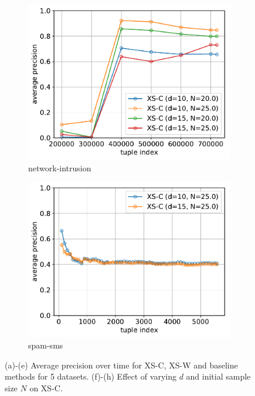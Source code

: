 \documentclass[11pt,onecolumn]{article}
\begin{document}
\begin{figure}[ht!]
\begin{subfigure}[t]{0.24\textwidth}
				\includegraphics[width=\linewidth]{fig/xs_c_depths_init_samples_http.pdf}
				\caption{network-intrusion}
		\end{subfigure}
		\begin{subfigure}[t]{0.24\textwidth}
				\centering
				\includegraphics[width=\linewidth]{fig/xs_c_depths_init_samples_sms.pdf}
				\caption{spam-sms}
		\end{subfigure}
		\caption{(a)-(e) Average precision over time for XS-C, XS-W and baseline methods for 5 datasets. (f)-(h) Effect of varying $d$ and initial sample size $N$ on XS-C.}
\end{figure}
\end{document}
